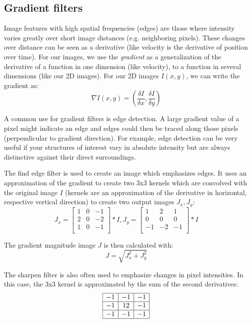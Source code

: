 \subsection{Gradient filters}

Image features with high spatial frequencies (edges) are those where intensity varies greatly over short image distances (e.g. neighboring pixels). These changes over distance can be seen as a derivative (like velocity is the derivative of position over time). For our images, we use the \emph{gradient} as a generalization of the derivative of a function in one dimension (like velocity), to a function in several dimensions (like our 2D images). For our 2D images $I(x,y)$, we can write the gradient as:
\[
	\nabla I(x,y)=\left(\frac{\delta I}{\delta x},\frac{\delta I}{\delta y}\right)
\]

A common use for gradient filters is edge detection. A large gradient value of a pixel might indicate an edge and edges could then be traced along those pixels (perpendicular to gradient direction). For example, edge detection can be very useful if your structures of interest vary in absolute intensity but are always distinctive against their direct surroundings. 

The find edge filter is used to create an image which emphasizes edges. It uses an approximation of the gradient to create two 3x3 kernels which are convolved with the original image $I$ (kernels are an approximation of the derivative in horizontal, respective vertical direction) to create two output images $J_{x}, J_{y}$:
	\[
		J_{x}=\left[\begin{array}{ccc}
	1&0&-1\\
2&0&-2\\
1&0&-1\\
	\end{array}\right]\ast I, J_{y}=\left[\begin{array}{ccc}
	1&2&1\\
0&0&0\\
-1&-2&-1\\
	\end{array}\right]\ast I
\]

The gradient magnitude image $J$ is then calculated with:
\[
	J=\sqrt{J_{x}^{2}+J_{y}^{2}}
\]


The sharpen filter is also often used to emphasize changes in pixel intensities. In this case, the 3x3 kernel is approximated by the sum of the second derivatives:
	\[
		\begin{array}{|c|c|c|}
	\hline
	-1&-1&-1\\
\hline
-1&12&-1\\
\hline
-1&-1&-1\\
\hline
	\end{array}
\]

